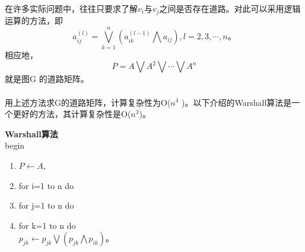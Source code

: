 \documentclass[11pt,a4paper,openany]{book}
\begin{document}
\paragraph{}在许多实际问题中，往往只要求了解$v_i$与$v_j$之间是否存在道路。对此可以采用逻辑运算的方法，即$$a_{ij}^{(l)}=\bigvee_{k=1}^{n}(a_{ik}^{(l-1)}\bigwedge a_{ij}),l=2,3,\cdots,n。$$相应地，$$P=A\bigvee A^2 \bigvee \cdots \bigvee A^n$$就是图G 的道路矩阵。
\paragraph{}用上述方法求G的道路矩阵，计算复杂性为Ο($n^4$ )。以下介绍的Warshall算法是一个更好的方法，其计算复杂性是Ο($n^3$)。
\begin{adjustwidth}{0.62cm}{0.62cm}
\textbf{Warshall算法}\\
begin\\
\begin{enumerate}
\item $P\leftarrow A$,
\item for i=1 to n do
\item \quad for j=1 to n do
\item \qquad for k=1 to n do\\ \indent\quad$p_{jk}\leftarrow p_{jk}\bigvee(p_{jk}\bigwedge p_{ik})$。
\end{enumerate}
\end{adjustwidth}
\end{document}
